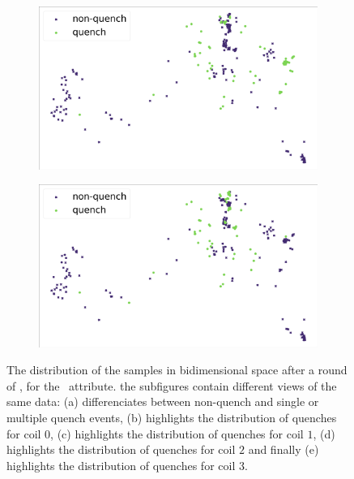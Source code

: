 \begin{figure}[!ht]
\begin{subfigure}{0.49\linewidth}
		\subcaption{}
	\end{subfigure}
	\begin{subfigure}{0.49\linewidth}
		\includegraphics[width=\linewidth]{img/quench_dist_qlp/quenches_coil_2_Phi.png}
		\subcaption{}
	\end{subfigure}
	\begin{subfigure}{0.49\linewidth}
		\includegraphics[width=\linewidth]{img/quench_dist_qlp/quenches_coil_3_Phi.png}
		\subcaption{}
	\end{subfigure}
	\caption{The distribution of the samples in bidimensional space after a round of \pca, for
		the \phin\ attribute. the subfigures contain different views of the same data: (a) differenciates between non-quench and single or multiple quench events, (b) highlights the distribution of quenches for coil $0$, (c) highlights the distribution of quenches for coil $1$, (d) highlights the distribution of quenches for coil $2$ and finally (e) highlights the distribution of quenches for coil $3$.}
	\label{fig:phi-coilq-dist}
\end{figure}

